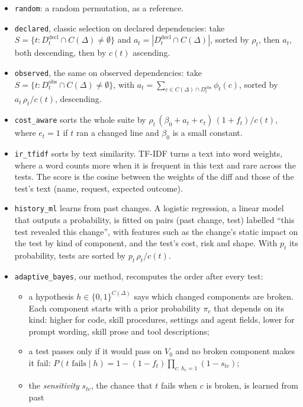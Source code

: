 \documentclass[11pt,a4paper]{article}
\newcommand{\strat}[1]{\texttt{#1}}
\newcommand{\Ddecl}{D^{\mathrm{decl}}_t}
\newcommand{\Dobs}{D^{\mathrm{obs}}_t}
\begin{document}
\begin{itemize}
  \item \strat{random}: a random permutation, as a reference.
  \item \strat{declared}, classic selection on declared dependencies: take $S = \{t : \Ddecl \cap C(\Delta) \neq
        \emptyset\}$ and $a_t = |\Ddecl \cap C(\Delta)|$, sorted by $\rho_t$, then $a_t$, both descending, then by
        $c(t)$ ascending.
  \item \strat{observed}, the same on observed dependencies: take $S = \{t : \Dobs \cap C(\Delta) \neq
        \emptyset\}$, with $a_t = \sum_{c \in C(\Delta) \cap \Dobs} \phi_t(c)$, sorted by $a_t\, \rho_t / c(t)$,
        descending.
  \item \strat{cost\_aware} sorts the whole suite by $\rho_t\, (\beta_0 + a_t + e_t)\, (1 + f_t) / c(t)$, where
        $e_t = 1$ if $t$ ran a changed line and $\beta_0$ is a small constant.
  \item \strat{ir\_tfidf} sorts by text similarity. TF-IDF turns a text into word weights, where a word counts more
        when it is frequent in this text and rare across the tests. The score is the cosine between the weights of
        the diff and those of the test's text (name, request, expected outcome).
  \item \strat{history\_ml} learns from past changes. A logistic regression, a linear model that outputs a
        probability, is fitted on pairs (past change, test) labelled ``this test revealed this change'', with
        features such as the change's static impact on the test by kind of component, and the test's cost, risk
        and shape. With $p_t$ its probability, tests are sorted by $p_t\, \rho_t / c(t)$.
  \item \strat{adaptive\_bayes}, our method, recomputes the order after every test:
  \begin{itemize}
    \item a hypothesis $h \in \{0,1\}^{C(\Delta)}$ says which changed components are broken. Each component
          starts with a prior probability $\pi_c$ that depends on its kind: higher for code, skill procedures,
          settings and agent fields, lower for prompt wording, skill prose and tool descriptions;
    \item a test passes only if it would pass on $V_0$ and no broken component makes it fail:
          $P(t \text{ fails} \mid h) = 1 - (1 - f_t) \prod_{c:\, h_c = 1} (1 - s_{tc})$;
    \item the \emph{sensitivity} $s_{tc}$, the chance that $t$ fails when $c$ is broken, is learned from past

\end{itemize}
\end{itemize}
\end{document}
